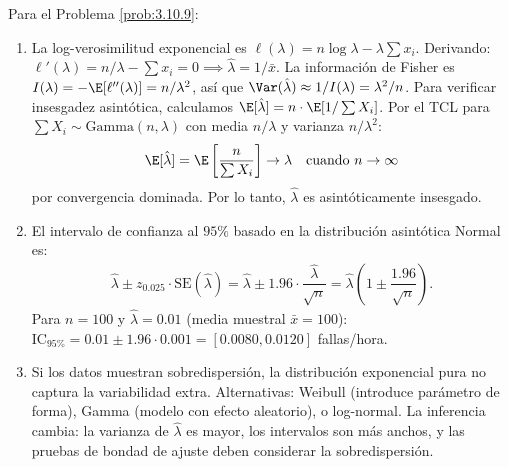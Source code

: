 \begin{solucion}
	\label{sol:3.10.9}
	Para el Problema \ref{prob:3.10.9}:
	\begin{enumerate}
		\item La log-verosimilitud exponencial es $\ell(\lambda) = n\log \lambda - \lambda \sum x_{i}$. Derivando: $\ell'(\lambda) = n/\lambda - \sum x_{i} = 0 \implies \hat{\lambda} = 1/\bar{x}$. La información de Fisher es $I(\lambda) = -\E[\ell''(\lambda)] = n/\lambda^{2}$, así que $\Var(\hat{\lambda}) \approx 1/I(\lambda) = \lambda^{2}/n$. Para verificar insesgadez asintótica, calculamos $\E[\hat{\lambda}] = n \cdot \E[1/\sum X_{i}]$. Por el TCL para $\sum X_{i} \sim \text{Gamma}(n, \lambda)$ con media $n/\lambda$ y varianza $n/\lambda^{2}$:
		\begin{align*}
			\E[\hat{\lambda}] = \E\left[\dfrac{n}{\sum X_{i}}\right] \to \lambda \quad \text{cuando } n \to \infty
		\end{align*}
		por convergencia dominada. Por lo tanto, $\hat{\lambda}$ es asintóticamente insesgado.
		\item El intervalo de confianza al $95\%$ basado en la distribución asintótica Normal es:
		\begin{align*}
			\hat{\lambda} \pm z_{0.025} \cdot \text{SE}(\hat{\lambda}) = \hat{\lambda} \pm 1.96 \cdot \dfrac{\hat{\lambda}}{\sqrt{n}} = \hat{\lambda}\left(1 \pm \dfrac{1.96}{\sqrt{n}}\right).
		\end{align*}
		Para $n = 100$ y $\hat{\lambda} = 0.01$ (media muestral $\bar{x} = 100$): $\text{IC}_{95\%} = 0.01 \pm 1.96 \cdot 0.001 = [0.0080, 0.0120]$ fallas/hora.
		\item Si los datos muestran sobredispersión, la distribución exponencial pura no captura la variabilidad extra. Alternativas: Weibull (introduce parámetro de forma), Gamma (modelo con efecto aleatorio), o log-normal. La inferencia cambia: la varianza de $\hat{\lambda}$ es mayor, los intervalos son más anchos, y las pruebas de bondad de ajuste deben considerar la sobredispersión.
	\end{enumerate}
\end{solucion}

